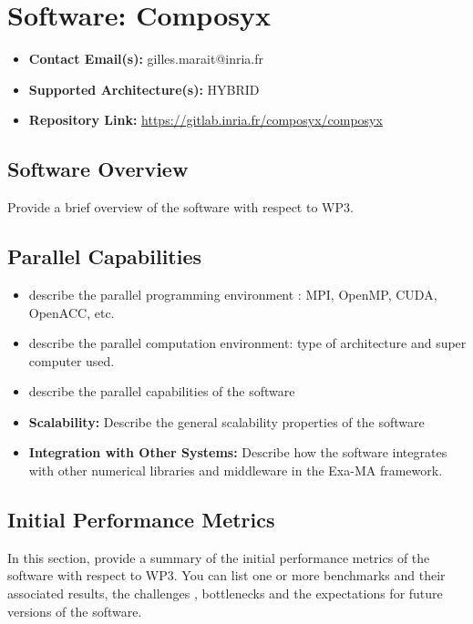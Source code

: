 \section{Software: Composyx}
\label{sec:WP3:Composyx:software}

\begin{itemize}
    \item \textbf{Contact Email(s):} gilles.marait@inria.fr
    \item \textbf{Supported Architecture(s):} HYBRID
    \item \textbf{Repository Link:} \href{https://gitlab.inria.fr/composyx/composyx}{https://gitlab.inria.fr/composyx/composyx}
\end{itemize}

\subsection{Software Overview}
\label{sec:WP3:Composyx:summary}

Provide a brief overview of the software with respect to WP3.

\subsection{Parallel Capabilities}
\label{sec:WP3:Composyx:performances}


\begin{itemize}
    \item describe the parallel programming  environment : MPI, OpenMP, CUDA, OpenACC, etc.
    \item describe the parallel computation environment: type of architecture and super computer used.
    \item describe the parallel capabilities of the software
    \item \textbf{Scalability:} Describe the general scalability properties of the software
    \item \textbf{Integration with Other Systems:} Describe how the software integrates with other numerical libraries and middleware in the Exa-MA framework.
\end{itemize}

\subsection{Initial Performance Metrics}
\label{sec:WP3:Composyx:metrics}

In this section, provide a summary of the initial performance metrics of the software with respect to WP3.
You can list one or more benchmarks and their associated results, the challenges , bottlenecks and the expectations for future versions of the software.



